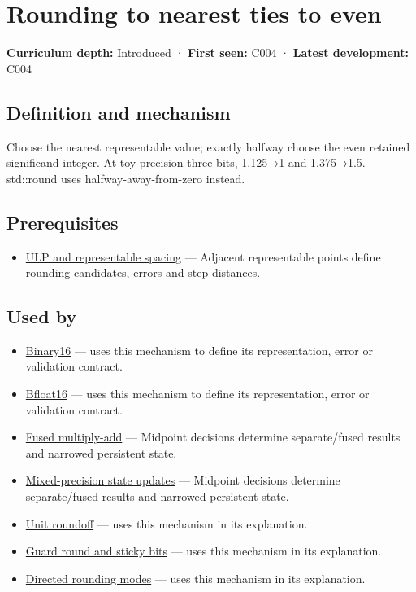\hypertarget{appendix-614afe1de592}{}\label{referencestart:appendix-614afe1de592}
\section{Rounding to nearest ties to even}\label{appendix-614afe1de592-rounding-to-nearest-ties-to-even}

\textbf{Curriculum depth:} Introduced · \textbf{First seen:} C004 · \textbf{Latest development:} C004

\subsection{Definition and mechanism}\label{appendix-614afe1de592-definition-and-mechanism}

Choose the nearest representable value; exactly halfway choose the even retained significand integer. At toy precision three bits, 1.125→1 and 1.375→1.5. std::round uses halfway-away-from-zero instead.

\subsection{Prerequisites}\label{appendix-614afe1de592-prerequisites}

\begin{itemize}
\tightlist
\item
  \hyperref[appendix-14bab4cab9d4]{ULP and representable spacing} --- Adjacent representable points define rounding candidates, errors and step distances.
\end{itemize}

\subsection{Used by}\label{appendix-614afe1de592-used-by}

\begin{itemize}
\item
  \hyperref[appendix-34443cec7170]{Binary16} --- uses this mechanism to define its representation, error or validation contract.
\item
  \hyperref[appendix-18b8dd966b5d]{Bfloat16} --- uses this mechanism to define its representation, error or validation contract.
\item
  \hyperref[appendix-41e8ef22a21e]{Fused multiply-add} --- Midpoint decisions determine separate/fused results and narrowed persistent state.
\item
  \hyperref[appendix-260182e617b7]{Mixed-precision state updates} --- Midpoint decisions determine separate/fused results and narrowed persistent state.
\item
  \hyperref[appendix-bc44f7b42f42]{Unit roundoff} --- uses this mechanism in its explanation.
\item
  \hyperref[appendix-b572b631069b]{Guard round and sticky bits} --- uses this mechanism in its explanation.
\item
  \hyperref[appendix-637d164ae5ca]{Directed rounding modes} --- uses this mechanism in its explanation.
\end{itemize}

